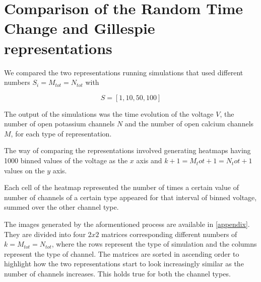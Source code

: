 \section{Comparison of the Random Time Change and Gillespie representations}

We compared the two representations running simulations that used different numbers $S_{i} = M_{tot} = N_{tot}$ with

$$S = [1, 10, 50, 100]$$

The output of the simulations was the time evolution of the voltage $V$, the number of open potassium channels $N$ and the number of open calcium channels $M$, for each type of representation.

The way of comparing the representations involved generating heatmaps having 1000 binned values of the voltage as the $x$ axis and $k + 1 = M_tot + 1 = N_tot  + 1$ values on the $y$ axis. 

Each cell of the heatmap represented the number of times a certain value of number of channels of a certain type appeared for that interval of binned voltage, summed over the other channel type. 

The images generated by the aformentioned process are available in \ref{appendix}. They are divided into four $2x2$ matrices corresponding different numbers of $k = M_{tot} = N_{tot}$, where the rows represent the type of simulation and the columns represent the type of channel. The matrices are sorted in ascending order to highlight how the two representations start to look increasingly similar as the number of channels increases. This holds true for both the channel types.

